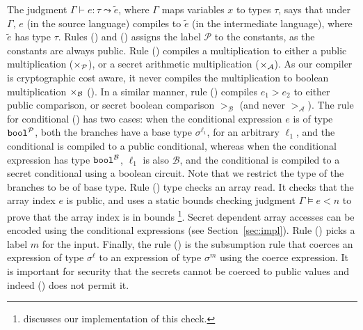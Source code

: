 The judgment $\Gamma \vdash e : \tau \leadsto \widetilde{e}$, where
$\Gamma$ maps variables $x$ to types $\tau$, says that
under $\Gamma$, $e$ (in the source language) compiles to $\widetilde{e}$
(in the intermediate language), where $\widetilde{e}$ has type $\tau$.
Rules ({}) and ({}) assigns the label
$\mathcal{P}$ to the constants, as the constants are always
public. Rule ({})
compiles a multiplication to either a public multiplication  ($\times_{\mathcal{P}}$), or a
secret arithmetic multiplication ($\times_{\mathcal{A}}$). As
our compiler is cryptographic cost aware, it never compiles the
multiplication to boolean multiplication $\times_{\mathcal{B}}$ (). In a similar manner,
rule ({}) compiles $e_{1} > e_{2}$ to either public comparison,
or secret boolean comparison $>_\mathcal{B}$ (and never
$>_{\mathcal{A}}$).
%
The rule for conditional
({}) has two cases: when the conditional expression $e$ is of
type ${\mathtt{bool}}^{\mathcal{P}}$, both the branches have a base type
$\sigma^{\ell_{1}}$, for an arbitrary $\ell_{1}$, and the conditional is
compiled to a public conditional, whereas when the conditional
expression has type ${\mathtt{bool}}^{\mathcal{B}}$, $\ell_{1}$ is also
$\mathcal{B}$, and the conditional is compiled to a secret conditional
using a boolean circuit. Note that we restrict the type of the branches
to be of base type. 
Rule ({}) type checks an array read. It checks
that the array index $e$ is public, and uses a static bounds checking
judgment $\Gamma \models e < n$ to prove that the array index is in
bounds \footnote{ discusses our implementation of this
check.}. Secret dependent array accesses can be encoded using the
conditional expressions (see Section~\ref{sec:impl}).  Rule
({}) picks a label
$m$ for the input. Finally,
the rule ({}) is the subsumption rule that coerces an expression of
type $\sigma^{\ell}$ to an expression of type $\sigma^{m}$ using the
coerce expression. It is important for security that the secrets
cannot be coerced to public values and indeed ({}) does not
permit it.

